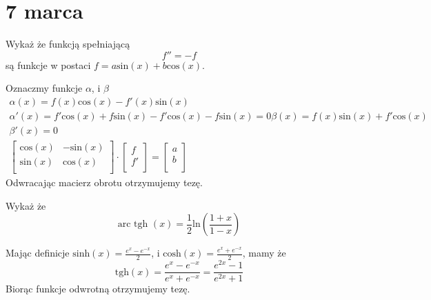 \documentclass[11pt]{scrartcl}
\begin{document}
  \section{7 marca}

  \begin{przykład}
      Wykaż że funkcją spełniającą
      \[
          f'' = -f
      \]
      są funkcje w postaci $f = a \text{sin} \left ( x \right ) + b \text{cos} \left ( x \right ) $.
  \end{przykład}
      Oznaczmy funkcje $\alpha $, i $\beta $
      \begin{gather*}
          \alpha \left ( x \right ) = f(x) \text{cos} \left ( x \right ) - f'(x) \text{sin} \left ( x \right ) \\
          \alpha' (x) = f' \text{cos} \left ( x \right ) + f \text{sin} \left ( x \right ) - f'\text{cos} \left ( x \right ) - f \text{sin} \left ( x \right ) = 0
          \beta \left ( x \right ) = f(x) \text{sin} \left ( x \right ) + f' \text{cos} \left ( x \right ) \\
          \beta' (x) = 0 \\
          \begin{bmatrix}
              \text{cos} \left ( x \right )  &  - \text{sin} \left ( x \right )  \\
              \text{sin} \left ( x \right )  & \text{cos} \left ( x \right )  \\
          \end{bmatrix}
          \cdot
          \begin{bmatrix}
              f \\
              f'  \\
          \end{bmatrix}
          =
          \begin{bmatrix}
               a \\
               b  \\
          \end{bmatrix}
      \end{gather*}
      Odwracając macierz obrotu otrzymujemy tezę.
      \begin{przykład}
          Wykaż że
          \[
            \text{arc tgh } \left ( x \right ) = \frac{1}{2} \text{ln} \left ( \frac{1+x}{1 - x} \right )  
          \]
          
      \end{przykład}
      Mając definicje $\text{sinh} \left ( x \right )  = \frac{e^x - e^{-x}}{2}$, i $\text{cosh} \left ( x \right )  = \frac{e^x + e^{-x}}{2}$, mamy że 
      \[
        \text{tgh} \left ( x \right ) = \frac{e^x - e^{-x}}{e^x + e^{-x}} = \frac{e^{2x} - 1}{e^{2x} + 1} 
      \]
      Biorąc funkcje odwrotną otrzymujemy tezę.
\end{document}
